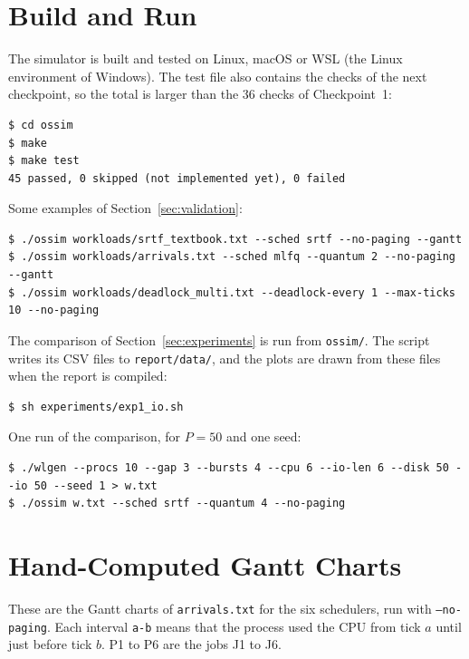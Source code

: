 \section{Build and Run}
\label{app:commands}
The simulator is built and tested on Linux, macOS or WSL (the Linux environment of Windows). The test file also contains the checks of the next checkpoint, so the total is larger than the 36 checks of Checkpoint~1:

\begin{lstlisting}
$ cd ossim
$ make
$ make test
45 passed, 0 skipped (not implemented yet), 0 failed
\end{lstlisting}

Some examples of Section~\ref{sec:validation}:
\begin{lstlisting}
$ ./ossim workloads/srtf_textbook.txt --sched srtf --no-paging --gantt
$ ./ossim workloads/arrivals.txt --sched mlfq --quantum 2 --no-paging --gantt
$ ./ossim workloads/deadlock_multi.txt --deadlock-every 1 --max-ticks 10 --no-paging
\end{lstlisting}

The comparison of Section~\ref{sec:experiments} is run from \texttt{ossim/}. The script writes its CSV files to \texttt{report/data/}, and the plots are drawn from these files when the report is compiled:
\begin{lstlisting}
$ sh experiments/exp1_io.sh
\end{lstlisting}

One run of the comparison, for $P=50$ and one seed:
\begin{lstlisting}
$ ./wlgen --procs 10 --gap 3 --bursts 4 --cpu 6 --io-len 6 --disk 50 --io 50 --seed 1 > w.txt
$ ./ossim w.txt --sched srtf --quantum 4 --no-paging
\end{lstlisting}

\section{Hand-Computed Gantt Charts}
\label{app:gantt}
These are the Gantt charts of \texttt{arrivals.txt} for the six schedulers, run with \texttt{--no-paging}. Each interval \texttt{a-b} means that the process used the CPU from tick $a$ until just before tick $b$. P1 to P6 are the jobs J1 to J6.

